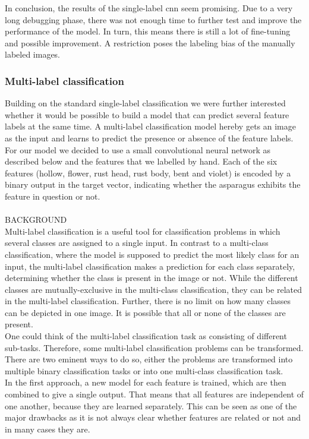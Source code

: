 \bigskip
In conclusion, the results of the single-label  \acrshort{cnn} seem promising. Due to a very long debugging phase, there was not enough time to further test and improve the performance of the model. In turn, this means there is still a lot of fine-tuning and possible improvement. A restriction poses the labeling bias of the manually labeled images.

\subsubsection{Multi-label classification}
\label{subsec:MultiLabel}


Building on the standard single-label classification we were further interested whether it would be possible to build a model that can predict several feature labels at the same time. A multi-label classification model hereby gets an image as the input and learns to predict the presence or absence of  the feature labels. \\
For our model we decided to use a small convolutional neural network as described below and the features that we labelled by hand. Each of the six features (hollow, flower, rust head, rust body, bent and violet) is encoded by a binary output in the target vector, indicating whether the asparagus exhibits the feature in question or not. \\
\\
BACKGROUND \\
Multi-label classification is a useful tool for classification problems in which several classes are assigned to a single input. In contrast to a multi-class classification, where the model is supposed to predict the most likely class for an input, the multi-label classification makes a prediction for each class separately, determining whether the class is present in the image or not. While the different classes are mutually-exclusive in the multi-class classification, they can be related in the multi-label classification. Further, there is no limit on how many classes can be depicted in one image. It is possible that all or none of the classes are present. \\
One could think of the multi-label classification task as consisting of different sub-tasks. Therefore, some multi-label classification problems can be transformed. There are two eminent ways to do so, either the problems  are transformed into multiple binary classification tasks or into one multi-class classification task. \\
In the first approach, a new model for each feature is trained, which are then combined to give a single output. That means that all features are independent of one another, because they are learned separately. This can be seen as one of the major drawbacks as it is not always clear whether features are related or not and in many cases they are.
